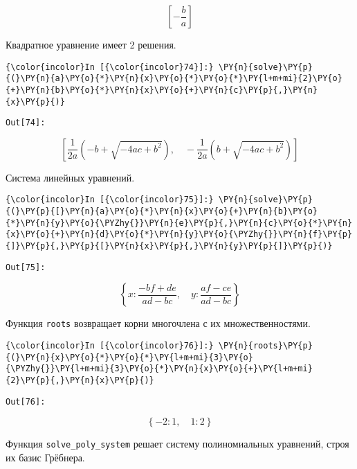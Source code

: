     \[\left [ - \frac{b}{a}\right ]\]

    

    Квадратное уравнение имеет 2 решения.

    \begin{Verbatim}[commandchars=\\\{\}]
{\color{incolor}In [{\color{incolor}74}]:} \PY{n}{solve}\PY{p}{(}\PY{n}{a}\PY{o}{*}\PY{n}{x}\PY{o}{*}\PY{o}{*}\PY{l+m+mi}{2}\PY{o}{+}\PY{n}{b}\PY{o}{*}\PY{n}{x}\PY{o}{+}\PY{n}{c}\PY{p}{,}\PY{n}{x}\PY{p}{)}
\end{Verbatim}
\texttt{\color{outcolor}Out[{\color{outcolor}74}]:}
    
    \[\left [ \frac{1}{2 a} \left(- b + \sqrt{- 4 a c + b^{2}}\right), \quad - \frac{1}{2 a} \left(b + \sqrt{- 4 a c + b^{2}}\right)\right ]\]

    

    Система линейных уравнений.

    \begin{Verbatim}[commandchars=\\\{\}]
{\color{incolor}In [{\color{incolor}75}]:} \PY{n}{solve}\PY{p}{(}\PY{p}{[}\PY{n}{a}\PY{o}{*}\PY{n}{x}\PY{o}{+}\PY{n}{b}\PY{o}{*}\PY{n}{y}\PY{o}{\PYZhy{}}\PY{n}{e}\PY{p}{,}\PY{n}{c}\PY{o}{*}\PY{n}{x}\PY{o}{+}\PY{n}{d}\PY{o}{*}\PY{n}{y}\PY{o}{\PYZhy{}}\PY{n}{f}\PY{p}{]}\PY{p}{,}\PY{p}{[}\PY{n}{x}\PY{p}{,}\PY{n}{y}\PY{p}{]}\PY{p}{)}
\end{Verbatim}
\texttt{\color{outcolor}Out[{\color{outcolor}75}]:}
    
    \[\left \{ x : \frac{- b f + d e}{a d - b c}, \quad y : \frac{a f - c e}{a d - b c}\right \}\]

    

    Функция \texttt{roots} возвращает корни многочлена с их
множественностями.

    \begin{Verbatim}[commandchars=\\\{\}]
{\color{incolor}In [{\color{incolor}76}]:} \PY{n}{roots}\PY{p}{(}\PY{n}{x}\PY{o}{*}\PY{o}{*}\PY{l+m+mi}{3}\PY{o}{\PYZhy{}}\PY{l+m+mi}{3}\PY{o}{*}\PY{n}{x}\PY{o}{+}\PY{l+m+mi}{2}\PY{p}{,}\PY{n}{x}\PY{p}{)}
\end{Verbatim}
\texttt{\color{outcolor}Out[{\color{outcolor}76}]:}
    
    \[\left \{ -2 : 1, \quad 1 : 2\right \}\]

    

    Функция \texttt{solve\_poly\_system} решает систему полиномиальных
уравнений, строя их базис Грёбнера.


